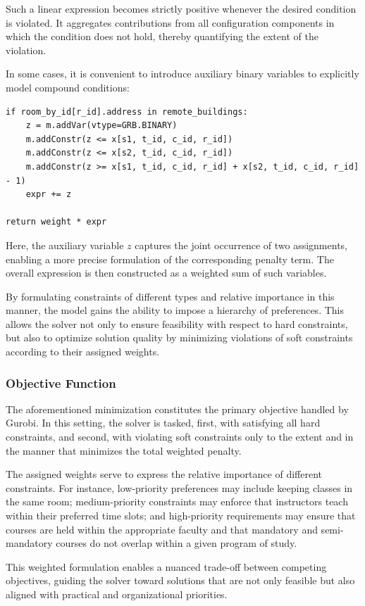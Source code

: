 \documentclass[11pt,a4paper]{article}
\begin{document}
Such a linear expression becomes strictly positive whenever the desired condition is violated. It aggregates contributions from all configuration components in which the condition does not hold, thereby quantifying the extent of the violation.

In some cases, it is convenient to introduce auxiliary binary variables to explicitly model compound conditions:
\begin{verbatim}
if room_by_id[r_id].address in remote_buildings:
    z = m.addVar(vtype=GRB.BINARY)
    m.addConstr(z <= x[s1, t_id, c_id, r_id])
    m.addConstr(z <= x[s2, t_id, c_id, r_id])
    m.addConstr(z >= x[s1, t_id, c_id, r_id] + x[s2, t_id, c_id, r_id] - 1)
    expr += z

return weight * expr
\end{verbatim}

Here, the auxiliary variable $z$ captures the joint occurrence of two assignments, enabling a more precise formulation of the corresponding penalty term. The overall expression is then constructed as a weighted sum of such variables.

By formulating constraints of different types and relative importance in this manner, the model gains the ability to impose a hierarchy of preferences. This allows the solver not only to ensure feasibility with respect to hard constraints, but also to optimize solution quality by minimizing violations of soft constraints according to their assigned weights.
\subsubsection{Objective Function}
The aforementioned minimization constitutes the primary objective handled by Gurobi. In this setting, the solver is tasked, first, with satisfying all hard constraints, and second, with violating soft constraints only to the extent and in the manner that minimizes the total weighted penalty.

The assigned weights serve to express the relative importance of different constraints. For instance, low-priority preferences may include keeping classes in the same room; medium-priority constraints may enforce that instructors teach within their preferred time slots; and high-priority requirements may ensure that courses are held within the appropriate faculty and that mandatory and semi-mandatory courses do not overlap within a given program of study.

This weighted formulation enables a nuanced trade-off between competing objectives, guiding the solver toward solutions that are not only feasible but also aligned with practical and organizational priorities.
\end{document}
